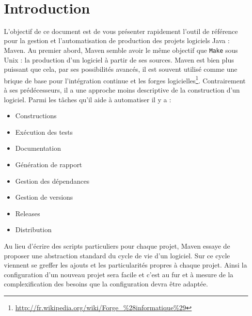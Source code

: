 \documentclass[a4paper,11pt]{article}
\date{}
\begin{document}

{\centering
    \mbox{
    }
}\\[0.4cm]
\section{Introduction}
L'objectif de ce document est de vous présenter rapidement l'outil de référence pour la gestion et l'automatisation 
de production des projets logiciels Java : Maven. Au premier abord, Maven semble avoir le même objectif que \texttt{Make} 
sous Unix : la production d'un logiciel à partir de ses sources. Maven est bien plus puissant que cela, par ses possibilités 
avancés, il est souvent utilisé comme une brique de base pour l'intégration continue et les forges 
logicielles\footnote{\url{http://fr.wikipedia.org/wiki/Forge_\%28informatique\%29}}. Contrairement à ses prédécesseurs, 
il a une approche moins descriptive de la construction d'un logiciel. Parmi les tâches qu'il aide à automatiser il y a :

\begin{itemize}
  \item Constructions
  \item Exécution des tests
  \item Documentation
  \item Génération de rapport
  \item Gestion des dépendances
  \item Gestion de versions
  \item Releases
  \item Distribution
\end{itemize}

Au lieu d'écrire des scripts particuliers pour chaque projet, Maven 
essaye de proposer une abstraction standard du cycle de vie d'un logiciel. Sur ce cycle viennent se greffer les ajouts et 
les particularités propres à chaque projet. Ainsi la configuration d'un nouveau projet sera facile et c'est au fur et à 
mesure de la complexification des besoins que la configuration devra être adaptée. 
\end{document}
